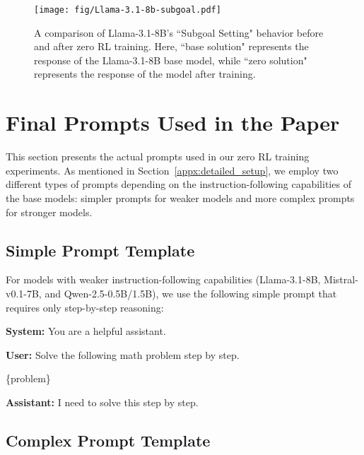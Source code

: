 \begin{figure}[!t]
        \centering
\texttt{[image: fig/Llama-3.1-8b-subgoal.pdf]}
\caption{A comparison of Llama-3.1-8B’s ``Subgoal Setting" behavior before and after zero RL training. Here, ``base solution" represents the response of the Llama-3.1-8B base model,
while ``zero solution" represents the response of the model after training.}
        \label{fig:llama3.1-8b_base_subgoal_setting}
\end{figure}

\section{Final Prompts Used in the Paper}
\label{sec:final_prompts}

This section presents the actual prompts used in our zero RL training experiments. As mentioned in Section~\ref{appx:detailed_setup}, we employ two different types of prompts depending on the instruction-following capabilities of the base models: simpler prompts for weaker models and more complex prompts for stronger models.

\subsection{Simple Prompt Template}

For models with weaker instruction-following capabilities (Llama-3.1-8B, Mistral-v0.1-7B, and Qwen-2.5-0.5B/1.5B), we use the following simple prompt that requires only step-by-step reasoning:

\begin{tcolorbox}[
colback=lightblue!10,
colframe=lightblue!50!black,
left=2mm, right=2mm,
title=\textcolor{black}{\textbf{Simple Prompt Template}}]

\begin{small}
\textbf{System:} You are a helpful assistant.

\textbf{User:} Solve the following math problem step by step.

\{problem\}

\textbf{Assistant:} I need to solve this step by step.
\end{small}

\end{tcolorbox}

\subsection{Complex Prompt Template}

